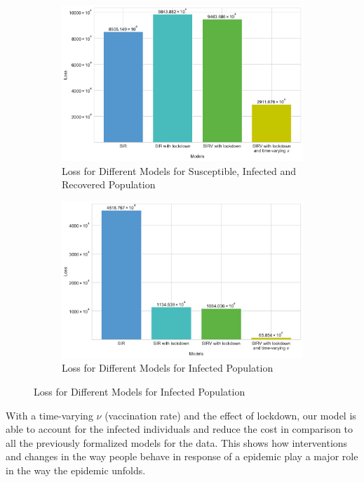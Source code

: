 \documentclass[tikz,fleqn,12pt]{wlscirep}
\begin{document}
\begin{figure}[htbp!]
	\caption{Loss for Different Models}
	\begin{subfigure}[t]{0.48\textwidth}
		\centering
		\includegraphics[width=\linewidth]{images/comparing_costs_SIR_IND.pdf}
		\caption{Loss for Different Models for Susceptible, Infected and Recovered Population}
		\label{fig:comparing_costs_SIR_IND}
	\end{subfigure}
	\hfill
	\begin{subfigure}[t]{0.48\textwidth}
		\centering
		\includegraphics[width=\linewidth]{images/comparing_costs_I_IND.pdf}
		\caption{Loss for Different Models for Infected Population}
		\label{fig:comparing_costs_I_IND}
	\end{subfigure}
\end{figure}

With a time-varying $\nu$ (vaccination rate) and the effect of lockdown, our model is able to account for the infected individuals and reduce the cost in comparison to all the previously formalized models for the data. This shows how interventions and changes in the way people behave in response of a epidemic \cite{Caldwell2021} play a major role in the way the epidemic unfolds.
\end{document}
